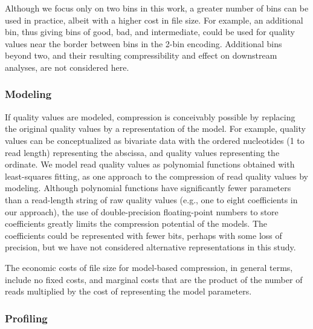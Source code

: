 \documentclass{bmcart}
\begin{document}
Although we focus only on two bins in this work, a greater number of
bins can be used in practice, albeit with a higher cost in file size.
For example, an additional bin, thus giving bins of good, bad, and
intermediate, could be used for quality values near the border between
bins in the 2-bin encoding. Additional bins beyond two, and their
resulting compressibility and effect on downstream analyses, are not
considered here.

\subsubsection*{Modeling}

If quality values are modeled, compression is conceivably possible by
replacing the original quality values by a representation of the
model. For example, quality values can be conceptualized as bivariate
data with the ordered nucleotides (1 to read length) representing the
abscissa, and quality values representing the ordinate. We model read
quality values as polynomial functions obtained with least-squares
fitting, as one approach to the compression of read quality values by
modeling. Although polynomial functions have significantly fewer
parameters than a read-length string of raw quality values (e.g., one
to eight coefficients in our approach), the use of double-precision
floating-point numbers to store coefficients greatly limits the
compression potential of the models. The coefficients could be
represented with fewer bits, perhaps with some loss of precision, but
we have not considered alternative representations in this study.

The economic costs of file size for model-based compression, in
general terms, include no fixed costs, and marginal costs that are the
product of the number of reads multiplied by the cost of representing
the model parameters.

\subsubsection*{Profiling}
\end{document}
